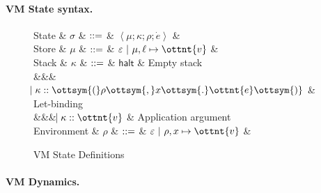 \paragraph{VM State syntax.}

\begin{figure}
  \begin{grammar}
    State
    & $\sigma$ & $\mathrel{::=}$ & $ \left<  \mu ;  \kappa ;  \rho ;  \dot{e}  \right> $ & 
    \\
    Store
    & $\mu$ & $\mathrel{::=}$ & $\varepsilon~|~ \mu  ,  \ell \mapsto \ottnt{v} $ &
    \\
    Stack
    & $\kappa$ & $\mathrel{::=}$ & $ \textsf{halt} $ & Empty stack
    \\
    &&& $\bnfaltbrk \kappa  ::  \ottsym{(}  \rho  \ottsym{,}  x  \ottsym{.}  \ottnt{e}  \ottsym{)}$ & Let-binding
    \\
    &&& $\bnfaltbrk \kappa  ::  \ottnt{v}$ & Application argument
    \\
    Environment
    & $\rho$   & $\mathrel{::=}$ & $\varepsilon~|~ \rho  ,  x \mapsto \ottnt{v} $ & 
  \end{grammar}
  \caption{VM State Definitions}
  \label{fig:state}
\end{figure}


\paragraph{VM Dynamics.}


